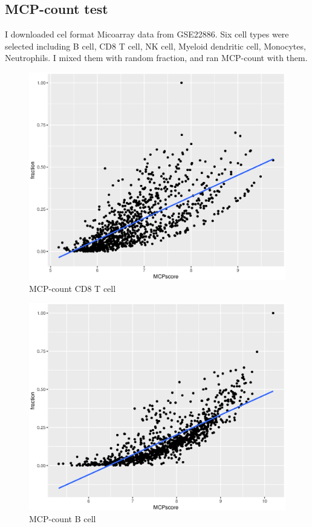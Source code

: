 \documentclass{article}
\begin{document}
  \subsection{MCP-count test}
  I downloaded cel format Micoarray data from GSE22886. Six cell types were selected including B cell, CD8 T cell, NK cell, Myeloid dendritic cell, Monocytes, Neutrophils. I mixed them with random fraction, and ran MCP-count with them.
  \begin{figure}[H]
     \centering
     \includegraphics[width=5in]{MCP-CD8T.eps}
     \caption{MCP-count CD8 T cell}
     \label{fig:my_label}
 \end{figure}
 \begin{figure}[H]
     \centering
     \includegraphics[width=5in]{MCP-B.eps}
     \caption{MCP-count B cell}
     \label{fig:my_label}
 \end{figure}
\end{document}
